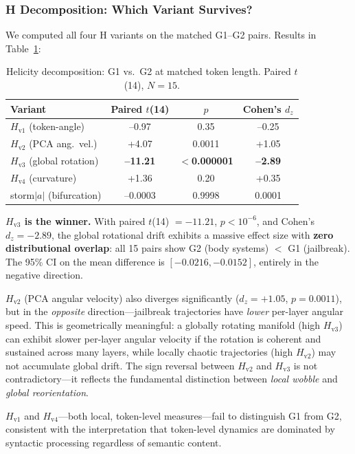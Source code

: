 \documentclass[12pt,a4paper]{article}
\begin{document}
\subsubsection{H Decomposition: Which Variant Survives?}

We computed all four H variants on the matched G1--G2 pairs. Results in Table~\ref{tab:h_decomp}:

\begin{table}[H]
\centering
\caption{Helicity decomposition: G1 vs.~G2 at matched token length. Paired $t$(14), $N=15$.}
\label{tab:h_decomp}
\begin{tabular}{lccc}
\toprule
Variant & Paired $t$(14) & $p$ & Cohen's $d_z$ \\
\midrule
$H_{\text{v1}}$ (token-angle)    & --0.97  & 0.35  & --0.25 \\
$H_{\text{v2}}$ (PCA ang.~vel.)  & +4.07   & 0.0011 & +1.05 \\
$H_{\text{v3}}$ (global rotation)& \textbf{--11.21} & \textbf{$<$0.000001} & \textbf{--2.89} \\
$H_{\text{v4}}$ (curvature)      & +1.36   & 0.20  & +0.35 \\
storm$|a|$ (bifurcation)         & --0.0003 & 0.9998 & 0.0001 \\
\bottomrule
\end{tabular}
\end{table}

\textbf{$H_{\text{v3}}$ is the winner.} With paired $t$(14) $= -11.21$, $p < 10^{-6}$, and Cohen's $d_z = -2.89$, the global rotational drift exhibits a massive effect size with \textbf{zero distributional overlap}: all 15 pairs show G2 (body systems) $<$ G1 (jailbreak). The 95\% CI on the mean difference is $[-0.0216, -0.0152]$, entirely in the negative direction.

$H_{\text{v2}}$ (PCA angular velocity) also diverges significantly ($d_z = +1.05$, $p = 0.0011$), but in the \textit{opposite} direction---jailbreak trajectories have \textit{lower} per-layer angular speed. This is geometrically meaningful: a globally rotating manifold (high $H_{\text{v3}}$) can exhibit slower per-layer angular velocity if the rotation is coherent and sustained across many layers, while locally chaotic trajectories (high $H_{\text{v2}}$) may not accumulate global drift. The sign reversal between $H_{\text{v2}}$ and $H_{\text{v3}}$ is not contradictory---it reflects the fundamental distinction between \textit{local wobble} and \textit{global reorientation}.

$H_{\text{v1}}$ and $H_{\text{v4}}$---both local, token-level measures---fail to distinguish G1 from G2, consistent with the interpretation that token-level dynamics are dominated by syntactic processing regardless of semantic content.
\end{document}
